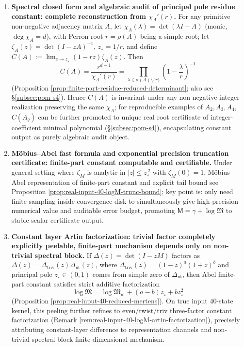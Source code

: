 \begin{enumerate}
  \item \textbf{Spectral closed form and algebraic audit of principal pole residue constant: complete reconstruction from \texorpdfstring{$\chi_A'(r)$}{chi'(r)}.}
  For any primitive non-negative adjacency matrix \(A\), let \(\chi_A(\lambda)=\det(\lambda I-A)\) (monic, \(\deg\chi_A=d\)), with Perron root \(r=\rho(A)\) being a simple root; let \(\zeta_A(z)=\det(I-zA)^{-1}\), \(z_\star=1/r\), and define
  \(
  C(A):=\lim_{z\to z_\star}(1-rz)\zeta_A(z)
  \).
  Then
  \[
  \boxed{\;
  C(A)=\frac{r^{d-1}}{\chi_A'(r)}
  =\prod_{\lambda\in\sigma(A)\setminus\{r\}}\left(1-\frac{\lambda}{r}\right)^{-1}\;}
  \]
  (Proposition \ref{prop:finite-part-residue-reduced-determinant}; also see \S\ref{subsec:pom-s4}).
  Hence \(C(A)\) is invariant under any non-negative integer realization preserving the same \(\chi_A\); for reproducible examples of \(A_2,A_3,A_4\), \(C(A_q)\) can be further promoted to unique real root certificate of integer-coefficient minimal polynomial (\S\ref{subsec:pom-s4}), encapsulating constant output as purely algebraic audit object.

  \item \textbf{M\"obius--Abel fast formula and exponential precision truncation certificate: finite-part constant computable and certifiable.}
  Under general setting where \(\zeta_M\) is analytic in \(|z|\le z_\star^{\,2}\) with \(\zeta_M(0)=1\), M\"obius--Abel representation of finite-part constant and explicit tail bound see Proposition \ref{prop:real-input-40-logM-trunc-bound}; key point is: only need finite sampling inside convergence disk to simultaneously give high-precision numerical value and auditable error budget, promoting \(\mathsf{M}=\gamma+\log\mathfrak{M}\) to stable scalar certificate output.

  \item \textbf{Constant layer Artin factorization: trivial factor completely explicitly peelable, finite-part mechanism depends only on non-trivial spectral block.}
  If \(\Delta(z)=\det(I-zM)\) factors as \(\Delta(z)=\Delta_{\mathrm{triv}}(z)\Delta_{\mathrm{nt}}(z)\), where \(\Delta_{\mathrm{triv}}(z)=(1-z)^a(1+z)^b\) and principal pole \(z_\star\in(0,1)\) comes from simple zero of \(\Delta_{\mathrm{nt}}\), then Abel finite-part constant satisfies strict additive factorization
  \[
  \boxed{\ \log\mathfrak{M}=\log\mathfrak{M}_{\mathrm{nt}}+(a-b)z_\star+b z_\star^2\ }
  \]
  (Proposition \ref{prop:real-input-40-reduced-mertens}).
  On true input 40-state kernel, this peeling further refines to even/twist/triv three-factor constant factorization (Remark \ref{rem:real-input-40-logM-artin-factorization}), precisely attributing constant-layer difference to representation channels and non-trivial spectral block finite-dimensional mechanism.


\end{enumerate}
